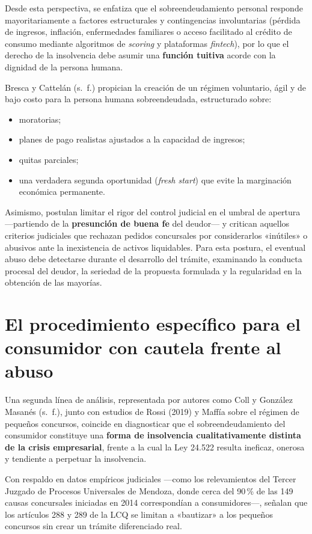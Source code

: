 \documentclass[12pt,oneside]{book}
\begin{document}
Desde esta perspectiva, se enfatiza que el sobreendeudamiento personal responde mayoritariamente a factores estructurales y contingencias involuntarias (pérdida de ingresos, inflación, enfermedades familiares o acceso facilitado al crédito de consumo mediante algoritmos de \textit{scoring} y plataformas \textit{fintech}), por lo que el derecho de la insolvencia debe asumir una \textbf{función tuitiva} acorde con la dignidad de la persona humana.

Bresca y Cattelán (s.~f.) propician la creación de un régimen voluntario, ágil y de bajo costo para la persona humana sobreendeudada, estructurado sobre:

\begin{itemize}
    \item moratorias;
    \item planes de pago realistas ajustados a la capacidad de ingresos;
    \item quitas parciales;
    \item una verdadera segunda oportunidad (\textit{fresh start}) que evite la marginación económica permanente.
\end{itemize}

Asimismo, postulan limitar el rigor del control judicial en el umbral de apertura ---partiendo de la \textbf{presunción de buena fe} del deudor--- y critican aquellos criterios judiciales que rechazan pedidos concursales por considerarlos «inútiles» o abusivos ante la inexistencia de activos liquidables. Para esta postura, el eventual abuso debe detectarse durante el desarrollo del trámite, examinando la conducta procesal del deudor, la seriedad de la propuesta formulada y la regularidad en la obtención de las mayorías.

\section{El procedimiento específico para el consumidor con cautela frente al abuso}

Una segunda línea de análisis, representada por autores como Coll y González Masanés (s.~f.), junto con estudios de Rossi (2019) y Maffía sobre el régimen de pequeños concursos, coincide en diagnosticar que el sobreendeudamiento del consumidor constituye una \textbf{forma de insolvencia cualitativamente distinta de la crisis empresarial}, frente a la cual la Ley 24.522 resulta ineficaz, onerosa y tendiente a perpetuar la insolvencia.

Con respaldo en datos empíricos judiciales ---como los relevamientos del Tercer Juzgado de Procesos Universales de Mendoza, donde cerca del 90\,\% de las 149 causas concursales iniciadas en 2014 correspondían a consumidores---, señalan que los artículos 288 y 289 de la LCQ se limitan a «bautizar» a los pequeños concursos sin crear un trámite diferenciado real.
\end{document}
